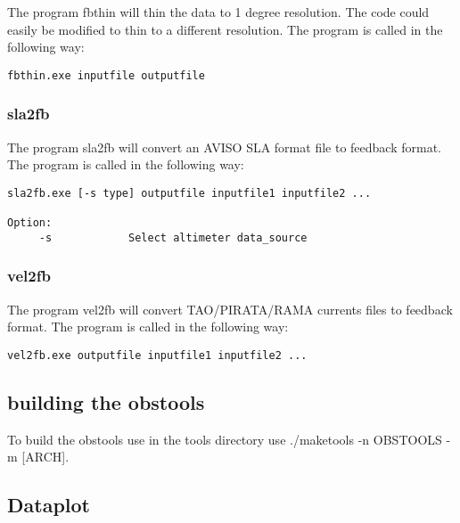 \documentclass[NEMO_book]{subfiles}
\begin{document}
The program fbthin will thin the data to 1 degree resolution. The code could easily be
modified to thin to a different resolution. The program is called in the following way:

\begin{alltt}
\footnotesize
\begin{verbatim}
fbthin.exe inputfile outputfile
\end{verbatim}
\end{alltt}

\subsubsection{sla2fb}

The program sla2fb will convert an AVISO SLA format file to feedback format. The program is
called in the following way:

\begin{alltt}
\footnotesize
\begin{verbatim}
sla2fb.exe [-s type] outputfile inputfile1 inputfile2 ...

Option:
     -s            Select altimeter data_source
\end{verbatim}
\end{alltt}

\subsubsection{vel2fb}

The program vel2fb will convert TAO/PIRATA/RAMA currents files to feedback format. The program
is called in the following way:

\begin{alltt}
\footnotesize
\begin{verbatim}
vel2fb.exe outputfile inputfile1 inputfile2 ...
\end{verbatim}
\end{alltt}

\subsection{building the obstools}

To build the obstools use in the tools directory use ./maketools -n OBSTOOLS -m [ARCH].

\subsection{Dataplot}
\end{document}
